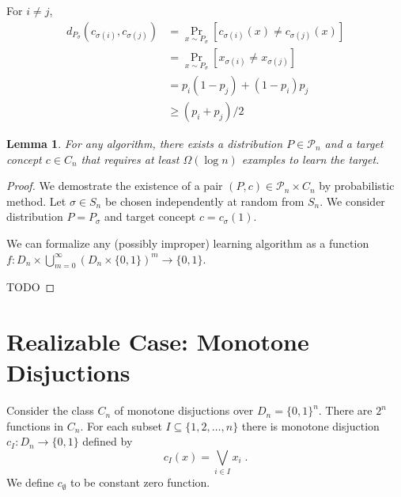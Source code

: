 \documentclass[12pt]{article}
\newtheorem{lemma}[proposition]{Lemma}
\renewcommand{\P}{\mathcal{P}}
\begin{document}
For $i \neq j$,
\begin{align*}
d_{P_\sigma}(c_{\sigma(i)}, c_{\sigma(j)})
& = \Pr_{x \sim P_{\sigma}}[c_{\sigma(i)}(x) \neq c_{\sigma(j)}(x)] \\
& = \Pr_{x \sim P_{\sigma}}[x_{\sigma(i)} \neq x_{\sigma(j)}] \\
& = p_i (1 - p_j) + (1 - p_i) p_j \\
& \ge (p_i + p_j) / 2
\end{align*}

\begin{lemma}
For any algorithm, there exists a distribution $P \in \P_n$
and a target concept $c \in C_n$ that requires at least $\Omega(\log n)$
examples to learn the target.
\end{lemma}

\begin{proof}
We demostrate the existence of a pair $(P,c) \in \P_n \times C_n$ by
probabilistic method. Let $\sigma \in S_n$ be chosen independently at random
from $S_n$. We consider distribution $P = P_\sigma$ and target concept $c =
c_\sigma(1)$.

We can formalize any (possibly improper) learning algorithm as a function $f:D_n
\times \bigcup_{m=0}^\infty (D_n \times \{0,1\})^m \to \{0,1\}$.

TODO
\end{proof}

\section{Realizable Case: Monotone Disjuctions}

Consider the class $C_n$ of monotone disjuctions over $D_n = \{0,1\}^n$.
There are $2^n$ functions in $C_n$. For each subset $I \subseteq \{1,2,\dots,n\}$
there is monotone disjuction $c_I:D_n \to \{0,1\}$ defined by
$$
c_I(x) = \bigvee_{i \in I} x_i \; .
$$
We define $c_\emptyset$ to be constant zero function.
\end{document}
